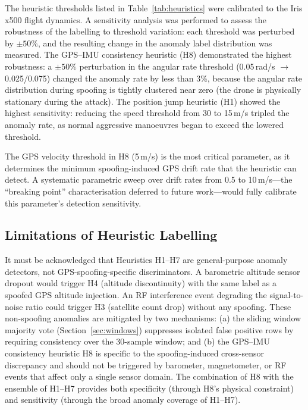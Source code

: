 The heuristic thresholds listed in Table~\ref{tab:heuristics} were calibrated to the Iris x500 flight dynamics. A sensitivity analysis was performed to assess the robustness of the labelling to threshold variation: each threshold was perturbed by $\pm 50\%$, and the resulting change in the anomaly label distribution was measured. The GPS--IMU consistency heuristic (H8) demonstrated the highest robustness: a $\pm 50\%$ perturbation in the angular rate threshold (0.05\,rad/s $\rightarrow$ 0.025/0.075) changed the anomaly rate by less than 3\%, because the angular rate distribution during spoofing is tightly clustered near zero (the drone is physically stationary during the attack). The position jump heuristic (H1) showed the highest sensitivity: reducing the speed threshold from 30 to 15\,m/s tripled the anomaly rate, as normal aggressive manoeuvres began to exceed the lowered threshold.

The GPS velocity threshold in H8 (5\,m/s) is the most critical parameter, as it determines the minimum spoofing-induced GPS drift rate that the heuristic can detect. A systematic parametric sweep over drift rates from 0.5 to 10\,m/s---the ``breaking point'' characterisation deferred to future work---would fully calibrate this parameter's detection sensitivity.

\subsection{Limitations of Heuristic Labelling}

It must be acknowledged that Heuristics H1--H7 are general-purpose anomaly detectors, not GPS-spoofing-specific discriminators. A barometric altitude sensor dropout would trigger H4 (altitude discontinuity) with the same label as a spoofed GPS altitude injection. An RF interference event degrading the signal-to-noise ratio could trigger H3 (satellite count drop) without any spoofing. These non-spoofing anomalies are mitigated by two mechanisms: (a) the sliding window majority vote (Section~\ref{sec:windows}) suppresses isolated false positive rows by requiring consistency over the 30-sample window; and (b) the GPS--IMU consistency heuristic H8 is specific to the spoofing-induced cross-sensor discrepancy and should not be triggered by barometer, magnetometer, or RF events that affect only a single sensor domain. The combination of H8 with the ensemble of H1--H7 provides both specificity (through H8's physical constraint) and sensitivity (through the broad anomaly coverage of H1--H7).

